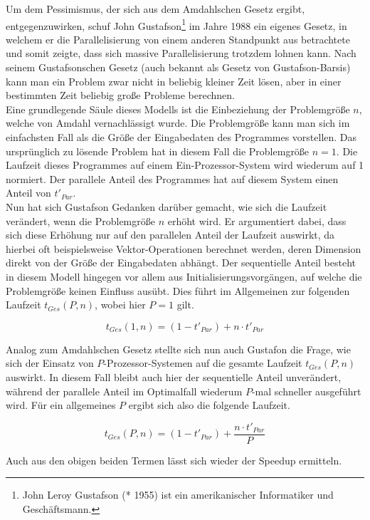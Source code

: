 				Um dem Pessimismus, der sich aus dem Amdahlschen Gesetz ergibt, entgegenzuwirken, schuf John Gustafson\footnote{John Leroy Gustafson (* 1955) ist ein amerikanischer Informatiker und Geschäftsmann.\cite{JohnGustafsonWikipedia}} im Jahre 1988 ein eigenes Gesetz, in welchem er die Parallelisierung von einem anderen Standpunkt aus betrachtete und somit zeigte, dass sich massive Parallelisierung trotzdem lohnen kann. Nach seinem Gustafsonschen Gesetz (auch bekannt als Gesetz von Gustafson-Barsis) kann man ein Problem zwar nicht in beliebig kleiner Zeit lösen, aber in einer bestimmten Zeit beliebig große Probleme berechnen.\\
				Eine grundlegende Säule dieses Modells ist die Einbeziehung der Problemgröße $n$, welche von Amdahl vernachlässigt wurde. Die Problemgröße kann man sich im einfachsten Fall als die Größe der Eingabedaten des Programmes vorstellen. Das ursprünglich zu lösende Problem hat in diesem Fall die Problemgröße $n = 1$. Die Laufzeit dieses Programmes auf einem Ein-Prozessor-System wird wiederum auf 1 normiert. Der parallele Anteil des Programmes hat auf diesem System einen Anteil von $t'_{Par}$.\\
				Nun hat sich Gustafson Gedanken darüber gemacht, wie sich die Laufzeit verändert, wenn die Problemgröße $n$ erhöht wird. Er argumentiert dabei, dass sich diese Erhöhung nur auf den parallelen Anteil der Laufzeit auswirkt, da hierbei oft beispielsweise Vektor-Operationen berechnet werden, deren Dimension direkt von der Größe der Eingabedaten abhängt. Der sequentielle Anteil besteht in diesem Modell hingegen vor allem aus Initialisierungsvorgängen, auf welche die Problemgröße keinen Einfluss ausübt. Dies führt im Allgemeinen zur folgenden Laufzeit $t_{Ges}(P, n)$, wobei hier $P = 1$ gilt.
				
				\[ t_{Ges}(1, n) = (1 - t'_{Par}) + n \cdot t'_{Par} \]
				
				Analog zum Amdahlschen Gesetz stellte sich nun auch Gustafon die Frage, wie sich der Einsatz von $P$-Prozessor-Systemen auf die gesamte Laufzeit $t_{Ges}(P, n)$ auswirkt. In diesem Fall bleibt auch hier der sequentielle Anteil unverändert, während der parallele Anteil im Optimalfall wiederum $P$-mal schneller ausgeführt wird. Für ein allgemeines $P$ ergibt sich also die folgende Laufzeit.
				
				\[ t_{Ges}(P, n) = (1 - t'_{Par}) + \frac{n \cdot t'_{Par}}{P} \]
				
				Auch aus den obigen beiden Termen lässt sich wieder der Speedup ermitteln.
				
